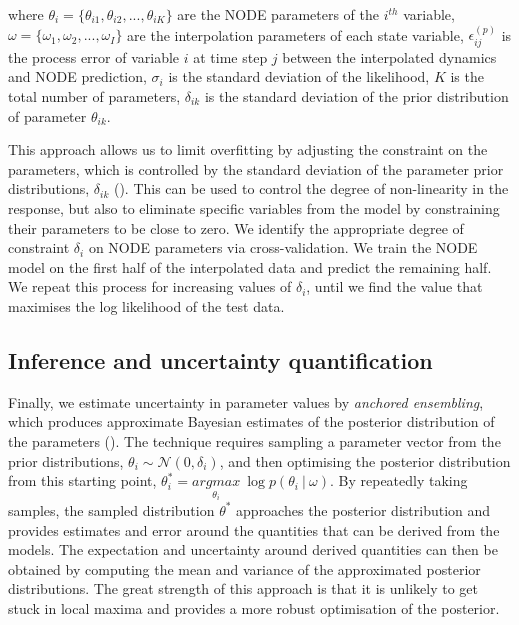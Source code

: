 \documentclass[11pt, oneside]{article}
\begin{document}
where $\theta_i = \{\theta_{i1},\theta_{i2},...,\theta_{iK}\}$ are the NODE parameters of the $i^{th}$ variable,
$\omega = \{\omega_1,\omega_2,...,\omega_I\}$ are the interpolation parameters of each state variable, 
$\epsilon^{(p)}_{ij}$ is the process error of variable $i$ at time step $j$ between the interpolated dynamics and NODE prediction, 
$\sigma_i$ is the standard deviation of the likelihood, 
$K$ is the total number of parameters, 
$\delta_{ik}$ is the standard deviation of the prior distribution of parameter $\theta_{ik}$.

This approach allows us to limit overfitting by adjusting the constraint on the parameters, which is controlled by the standard deviation of the parameter prior distributions, $\delta_{ik}$ (\cite{Cawley2007, Bonnaffe2021a}).
This can be used to control the degree of non-linearity in the response, but also to eliminate specific variables from the model by constraining their parameters to be close to zero.
We identify the appropriate degree of constraint $\delta_{i}$ on NODE parameters via cross-validation. 
We train the NODE model on the first half of the interpolated data and predict the remaining half.
We repeat this process for increasing values of $\delta_{i}$, until we find the value that maximises the log likelihood of the test data.

\subsection{Inference and uncertainty quantification}

Finally, we estimate uncertainty in parameter values by \textit{anchored ensembling}, which produces approximate Bayesian estimates of the posterior distribution of the parameters (\cite{Pearce2018}).
The technique requires sampling a parameter vector from the prior distributions, $\theta_{i} \sim \mathcal{N}(0,\delta_{i})$, and then optimising the posterior distribution from this starting point, $\theta^*_i = \underset{\theta_i}{argmax}~\log p(\theta_i~|~\omega)$.
By repeatedly taking samples, the sampled distribution $\theta^*$ approaches the posterior distribution and provides estimates and error around the quantities that can be derived from the models.
The expectation and uncertainty around derived quantities can then be obtained by computing the mean and variance of the approximated posterior distributions.
The great strength of this approach is that it is unlikely to get stuck in local maxima and provides a more robust optimisation of the posterior.
\end{document}
